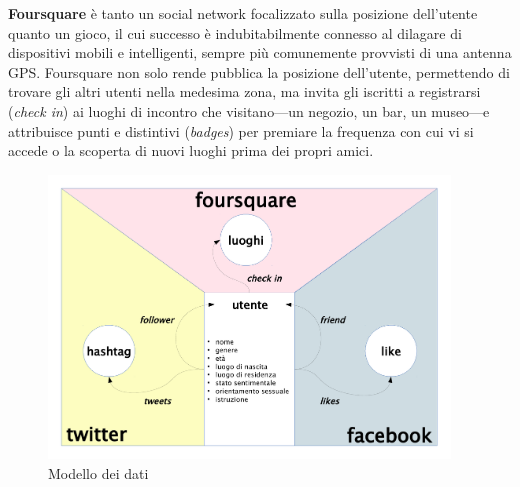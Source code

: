 \textbf{Foursquare} \`e tanto un social network focalizzato sulla posizione dell'utente quanto un gioco, il cui successo \`e indubitabilmente connesso al dilagare di dispositivi mobili e intelligenti, sempre pi\`u comunemente provvisti di una antenna GPS. Foursquare non solo rende pubblica la posizione dell'utente, permettendo di trovare gli altri utenti nella medesima zona, ma invita gli iscritti a registrarsi (\textit{check in}) ai luoghi di incontro che visitano---un negozio, un bar, un museo---e attribuisce punti e distintivi (\textit{badges}) per premiare la frequenza con cui vi si accede o la scoperta di nuovi luoghi prima dei propri amici.
\begin{figure}[h]
    \centering
    \includegraphics[width=0.95\textwidth]{pictures/modello_dati.pdf}
    \caption{Modello dei dati}
    \label{fig:modello_dati}
\end{figure}
